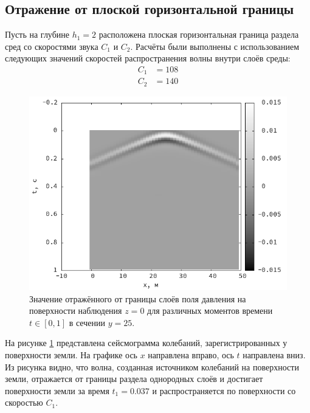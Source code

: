 \documentclass[a4paper, fontsize=14pt]{article}
\begin{document}
	\subsection{Отражение от плоской горизонтальной границы} \label{sect:horizontal}
	
	Пусть на глубине $h_1 = 2$ расположена плоская горизонтальная граница раздела сред со скоростями звука $C_1$ и $C_2$. 
	Расчёты были выполнены с использованием следующих значений скоростей распространения волны внутри слоёв среды:
\begin{align*}
	C_1 &= 108 \\
	C_2 &= 140 
\end{align*}
	
\begin{figure}[H]
	\centering
	\includegraphics[width=.7\textwidth]{smooth_single_seism.png}
	\caption{Значение отражённого от границы слоёв поля давления на поверхности наблюдения $z = 0$ для различных моментов времени $t\in [0,1]$ в сечении $y=25$.}
	\label{fig:single_hor}
\end{figure}
	На рисунке \ref{fig:single_hor} представлена сейсмограмма колебаний, зарегистрированных у поверхности земли. На графике ось $x$ направлена вправо, ось $t$ направлена  вниз.
	Из рисунка видно, что волна, созданная источником колебаний на поверхности земли, отражается от границы раздела однородных слоёв и достигает поверхности земли за время $t_1 = 0.037$ и распространяется по поверхности со скоростью $C_1$. 
\end{document}
